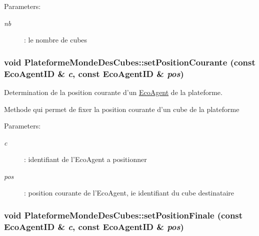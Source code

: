 \begin{Desc}
\item[Parameters:]
\begin{description}
\item[{\em nb}]: le nombre de cubes \end{description}
\end{Desc}
\hypertarget{classPlateformeMondeDesCubes_ecc518787fb8231be37e7b8eb3c5390e}{
\subsubsection[{setPositionCourante}]{\setlength{\rightskip}{0pt plus 5cm}void PlateformeMondeDesCubes::setPositionCourante (const {\bf EcoAgentID} \& {\em c}, \/  const {\bf EcoAgentID} \& {\em pos})}}
\label{classPlateformeMondeDesCubes_ecc518787fb8231be37e7b8eb3c5390e}


Determination de la position courante d'un \hyperlink{classEcoAgent}{EcoAgent} de la plateforme. 

Methode qui permet de fixer la position courante d'un cube de la plateforme

\begin{Desc}
\item[Parameters:]
\begin{description}
\item[{\em c}]: identifiant de l'EcoAgent a positionner \item[{\em pos}]: position courante de l'EcoAgent, ie identifiant du cube destinataire \end{description}
\end{Desc}
\hypertarget{classPlateformeMondeDesCubes_315f30b3c7c1e8bc9ec828a66a5813e5}{
\subsubsection[{setPositionFinale}]{\setlength{\rightskip}{0pt plus 5cm}void PlateformeMondeDesCubes::setPositionFinale (const {\bf EcoAgentID} \& {\em c}, \/  const {\bf EcoAgentID} \& {\em pos})}}
\label{classPlateformeMondeDesCubes_315f30b3c7c1e8bc9ec828a66a5813e5}


